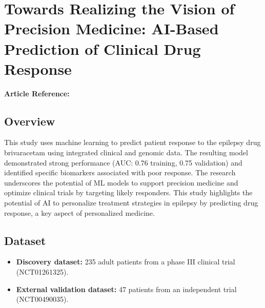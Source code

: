 \section{Towards Realizing the Vision of Precision Medicine: AI-Based Prediction of Clinical Drug Response}
\textbf{Article Reference:} \cite{dejongRealizingVisionPrecision2021}

\subsection*{Overview}
This study uses machine learning to predict patient response to the epilepsy drug brivaracetam using integrated clinical and genomic data. The resulting model demonstrated strong performance (AUC: 0.76 training, 0.75 validation) and identified specific biomarkers associated with poor response. The research underscores the potential of ML models to support precision medicine and optimize clinical trials by targeting likely responders. This study highlights the potential of AI to personalize treatment strategies in epilepsy by predicting drug response, a key aspect of personalized medicine.

\subsection*{Dataset}
\begin{itemize}
    \item \textbf{Discovery dataset:} 235 adult patients from a phase III clinical trial (NCT01261325).
    \item \textbf{External validation dataset:} 47 patients from an independent trial (NCT00490035).
\end{itemize}

